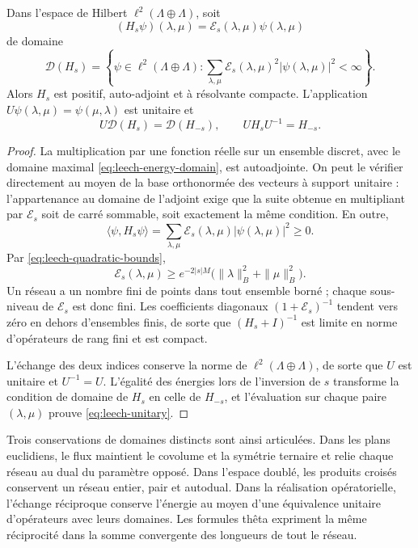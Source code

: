 \begin{theorem}
\label{thm:leech-energy}
Dans l’espace de Hilbert \(\ell^2(\Lambda\oplus\Lambda)\), soit
\[
 (H_s\psi)(\lambda,\mu)=
       \mathcal E_s(\lambda,\mu)\psi(\lambda,\mu)
\]
de domaine
\begin{equation}
 \mathcal D(H_s)=
 \left\{\psi\in\ell^2(\Lambda\oplus\Lambda):
 \sum_{\lambda,\mu}\mathcal E_s(\lambda,\mu)^2
             |\psi(\lambda,\mu)|^2<\infty\right\}.
 \label{eq:leech-energy-domain}
\end{equation}
Alors \(H_s\) est positif, auto-adjoint et à résolvante compacte.
L’application \(U\psi(\lambda,\mu)=\psi(\mu,\lambda)\) est unitaire et
\begin{equation}
 U\mathcal D(H_s)=\mathcal D(H_{-s}),\qquad
 UH_sU^{-1}=H_{-s}.
 \label{eq:leech-unitary}
\end{equation}
\end{theorem}
\begin{proof}
La multiplication par une fonction réelle sur un ensemble discret,
avec le domaine maximal \eqref{eq:leech-energy-domain}, est
autoadjointe. On peut le vérifier directement au moyen de la base
orthonormée des vecteurs à support unitaire : l’appartenance
au domaine de l’adjoint exige que la suite obtenue en
multipliant par \(\mathcal E_s\) soit de carré sommable, soit exactement
la même condition. En outre,
\[
 \langle\psi,H_s\psi\rangle
   =\sum_{\lambda,\mu}\mathcal E_s(\lambda,\mu)
                         |\psi(\lambda,\mu)|^2\geq0.
\]
Par \eqref{eq:leech-quadratic-bounds},
\[
 \mathcal E_s(\lambda,\mu)\geq
 e^{-2|s|M}\bigl(\|\lambda\|_B^2+\|\mu\|_B^2\bigr).
\]
Un réseau a un nombre fini de points dans tout ensemble borné ; chaque sous-niveau de \(\mathcal E_s\) est donc fini. Les coefficients diagonaux \((1+\mathcal E_s)^{-1}\) tendent vers zéro en dehors d'ensembles finis, de sorte que \((H_s+I)^{-1}\) est limite en norme d'opérateurs de rang fini et est compact.

L’échange des deux indices conserve la norme de
\(\ell^2(\Lambda\oplus\Lambda)\), de sorte que \(U\) est unitaire
et \(U^{-1}=U\). L’égalité des énergies lors de l’inversion de \(s\) transforme
la condition de domaine de \(H_s\) en celle de \(H_{-s}\), et
l’évaluation sur chaque paire \((\lambda,\mu)\) prouve
\eqref{eq:leech-unitary}.
\end{proof}

Trois conservations de domaines distincts sont ainsi articulées. Dans les plans euclidiens, le flux maintient le covolume et la symétrie ternaire et relie chaque réseau au dual du paramètre opposé. Dans l'espace doublé, les produits croisés conservent un réseau entier, pair et autodual. Dans la réalisation opératorielle, l'échange réciproque conserve l'énergie au moyen d'une équivalence unitaire d'opérateurs avec leurs domaines. Les formules thêta expriment la même réciprocité dans la somme convergente des longueurs de tout le réseau.
